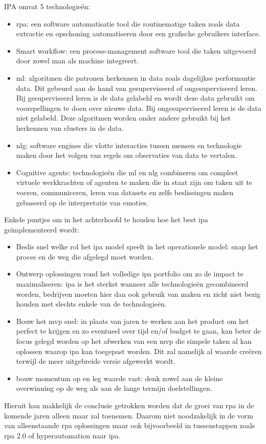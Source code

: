 IPA omvat 5 technologieën:
\begin{itemize}
	\item \acrshort{rpa}: een software automatisatie tool die routinematige taken zoals data extractie en opschoning automatiseren door een grafische gebruikers interface.
	\item Smart \gls{workflow}: een process-management software tool die taken uitgevoerd door zowel man als machine integreert.
	\item  \acrshort{ml}: algoritmen die patronen herkennen in data zoals dagelijkse performantie data. Dit gebeurd aan de hand van gesuperviseerd of ongesuperviseerd leren. Bij gesuperviseerd leren is de data gelabeld en wordt deze data gebruikt om voorspellingen te doen over nieuwe data. Bij ongesuperviseerd leren is de data niet gelabeld. Deze algoritmen worden onder andere gebruikt bij het herkennen van clusters in de data.
	\item  \acrshort{nlg}: software engines die vlotte interacties tussen mensen en technologie maken door het volgen van regels om observaties van data te vertalen.
	\item Cognitive agents: technologieën die  \acrshort{ml} en  \acrshort{nlg} combineren om compleet virtuele werkkrachten of agenten te maken die in staat zijn om taken uit te voeren, communiceren, leren van datasets en zelfs beslissingen maken gebaseerd op de interpretatie van emoties.
\end{itemize}

Enkele puntjes om in het achterhoofd te houden hoe het best  \acrshort{ipa} geïmplementeerd wordt:
\begin{itemize}
	\item Beslis snel welke rol het \acrshort{ipa} model speelt in het operationele model: snap het proces en de weg die afgelegd moet worden.
	\item Ontwerp oplossingen rond het volledige \acrshort{ipa} portfolio om zo de impact te maximaliseren: \acrshort{ipa} is het sterkst wanneer alle technologieën gecombineerd worden, bedrijven moeten hier dan ook gebruik van maken en zicht niet bezig houden met slechts enkele van de technologieën.
	\item Bouw het \acrfull{mvp} snel: in plaats van jaren te werken aan het product om het perfect te krijgen en zo eventueel over tijd en/of budget te gaan, kan beter de focus gelegd worden op het afwerken van een \acrshort{mvp} die simpele taken al kan oplossen waarop \acrshort{ipa} kan toegepast worden. Dit zal namelijk al waarde creëren terwijl de meer uitgebreide versie afgewerkt wordt.
	\item bouw momentum op en leg waarde vast: denk zowel aan de kleine overwinning op de weg als aan de  lange termijn doelstellingen.
\end{itemize} \autocite{everythingIPA}

Hieruit kan makkelijk de conclusie getrokken worden dat de groei van \acrshort{rpa} in de komende jaren alleen maar zal toenemen. Daarom niet noodzakelijk in de vorm van alleenstaande \acrshort{rpa} oplossingen maar ook bijvoorbeeld in tussenstappen zoals \acrshort{rpa} 2.0 of hyperautomation naar \acrshort{ipa}.